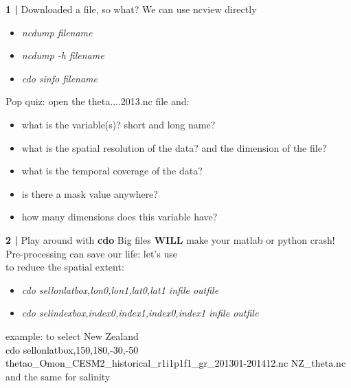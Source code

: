 \begin{frame}{\textbf{1 |} Downloaded a file, so what?}
    We can use ncview directly \\
        \begin{itemize}
            \item \textit{ncdump filename} 
            \item \textit{ncdump -h filename} 
            \item \textit{cdo sinfo filename} 
        \end{itemize}
    \vspace{2cm}
    \begin{beamerboxesrounded}[lower=gray,shadow=true]{Pop quiz: open the theta....2013.nc file and:
        \begin{itemize}
            \item what is the variable(s)? short and long name?
            \item what is the spatial resolution of the data? and the dimension of the file?
            \item what is the temporal coverage of the data?
         \item is there a mask value anywhere? 
         \item how many dimensions does this variable have?
        \end{itemize}
        }
    \end{beamerboxesrounded}
\end{frame}
 
 

\begin{frame}{\textbf{2 |} Play around with \textbf{cdo}}
    Big files \textbf{WILL} make your matlab or python crash!\\
        \vspace{0.3cm}
    Pre-processing can save our life: let's use \href{http://www.idris.fr/media/ada/cdo.pdf}{}\\
        \vspace{0.5cm}
    to reduce the spatial extent:
    \begin{itemize}
        \item \textit{cdo sellonlatbox,lon0,lon1,lat0,lat1 infile outfile }
           \vspace{0.3cm}
        \item \textit{cdo selindexbox,index0,index1,index0,index1 infile outfile }
    \end{itemize}
        \vspace{0.4cm}
    example: to select New Zealand \\
        \vspace{0.3cm}
    \textcolor{black}{cdo sellonlatbox,150,180,-30,-50 thetao\_Omon\_CESM2\_historical\_r1i1p1f1\_gr\_201301-201412.nc NZ\_theta.nc }\\
        \vspace{0.3cm}
    and the same for salinity
\end{frame}
  
